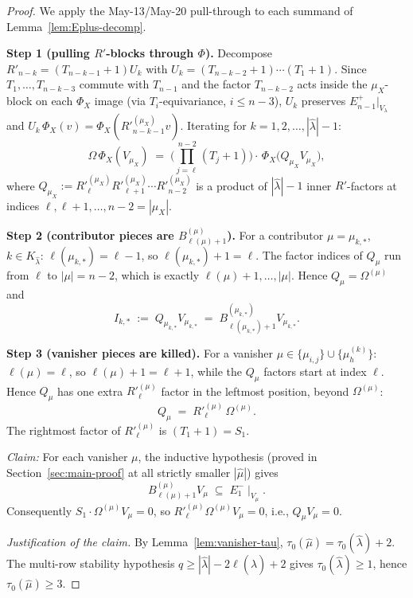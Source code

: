 \documentclass[11pt]{article}
\theoremstyle{definition}
\newcommand{\Vlam}{V_\lambda}
\newcommand{\Om}{\Omega}
\newcommand{\hatl}{\widehat\lambda}
\newcommand{\hatm}{\widehat\mu}
\newcommand{\Rp}{{R'}}
\newcommand{\elh}{\ell(\hatl)}
\begin{document}
\begin{proof}
We apply the May-13/May-20 pull-through to each summand of
Lemma~\ref{lem:Eplus-decomp}.

\medskip\textbf{Step 1 (pulling $\Rp$-blocks through $\Phi$).}
Decompose $\Rp_{n-k} = (T_{n-k-1} + 1) U_k$ with $U_k = (T_{n-k-2}+1)
\cdots (T_1 + 1)$.  Since $T_1, \ldots, T_{n-k-3}$ commute with
$T_{n-1}$ and the factor $T_{n-k-2}$ acts inside the $\mu_X$-block
on each $\Phi_X$ image (via $T_i$-equivariance, $i \le n-3$),
$U_k$ preserves $E_{n-1}^+|_{\Vlam}$ and
$U_k\,\Phi_X(v) = \Phi_X(\Rp_{n-k-1}^{(\mu_X)} v)$.  Iterating for
$k = 1, 2, \ldots, |\hatl| - 1$:
\begin{equation}\label{eq:branchpull}
   \Om\,\Phi_X(V_{\mu_X}) \;=\; \biggl(\prod_{j=\ell}^{n-2}(T_j + 1)\biggr)
   \cdot\, \Phi_X\bigl(Q_{\mu_X} V_{\mu_X}\bigr),
\end{equation}
where $Q_{\mu_X} := \Rp_{\ell}^{(\mu_X)} \Rp_{\ell+1}^{(\mu_X)} \cdots
\Rp_{n-2}^{(\mu_X)}$ is a product of $|\hatl| - 1$ inner
$\Rp$-factors at indices $\ell, \ell+1, \ldots, n-2 = |\mu_X|$.

\medskip\textbf{Step 2 (contributor pieces are $B^{(\mu)}_{\ell(\mu)+1}$).}
For a contributor $\mu = \mu_{k,*}$, $k \in K_{\hatl}$:
$\ell(\mu_{k,*}) = \ell - 1$, so $\ell(\mu_{k,*}) + 1 = \ell$.  The
factor indices of $Q_{\mu}$ run from $\ell$ to $|\mu| = n - 2$, which
is exactly $\ell(\mu)+1, \ldots, |\mu|$.  Hence $Q_{\mu} = \Om^{(\mu)}$
and
\[
   I_{k,*} \;:=\; Q_{\mu_{k,*}} V_{\mu_{k,*}}
   \;=\; B^{(\mu_{k,*})}_{\ell(\mu_{k,*})+1} V_{\mu_{k,*}}.
\]

\medskip\textbf{Step 3 (vanisher pieces are killed).}
For a vanisher $\mu \in \{\mu_{i,j}\} \cup \{\mu_h^{(k)}\}$:
$\ell(\mu) = \ell$, so $\ell(\mu) + 1 = \ell + 1$, while the
$Q_\mu$ factors start at index $\ell$.  Hence $Q_\mu$ has one extra
$\Rp_\ell^{(\mu)}$ factor in the leftmost position, beyond
$\Om^{(\mu)}$:
\[
   Q_\mu \;=\; \Rp_{\ell}^{(\mu)}\, \Om^{(\mu)}.
\]
The rightmost factor of $\Rp_{\ell}^{(\mu)}$ is $(T_1 + 1) = S_1$.

\smallskip\emph{Claim:} For each vanisher $\mu$, the inductive
hypothesis (proved in Section~\ref{sec:main-proof} at all strictly
smaller $|\hatm|$) gives
\[
   B^{(\mu)}_{\ell(\mu)+1} V_\mu \;\subseteq\; E_1^-\!\mid_{V_\mu}.
\]
Consequently $S_1 \cdot \Om^{(\mu)} V_\mu = 0$, so
$\Rp_{\ell}^{(\mu)} \Om^{(\mu)} V_\mu = 0$, i.e., $Q_\mu V_\mu = 0$.

\smallskip\emph{Justification of the claim.}  By
Lemma~\ref{lem:vanisher-tau}, $\tau_0(\hatm) = \tau_0(\hatl) + 2$.  The
multi-row stability hypothesis $q \ge |\hatl| - 2\elh + 2$ gives
$\tau_0(\hatl) \ge 1$, hence $\tau_0(\hatm) \ge 3$.


\end{proof}
\end{document}
